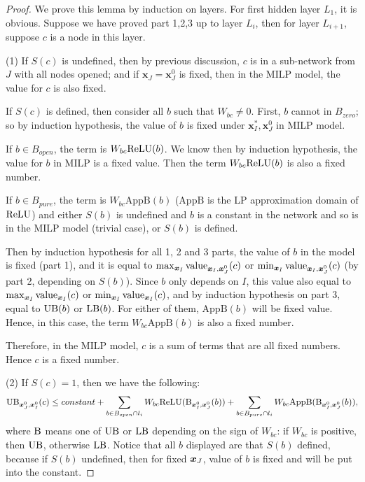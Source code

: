 			\begin{proof}
				We prove this lemma by induction on layers. For first hidden layer $L_1$, it is obvious. Suppose we have proved part 1,2,3 up to layer $L_i$, then for layer $L_{i+1}$, suppose $c$ is a node in this layer. 
				
				(1)	If $S(c)$ is undefined, then by previous discussion, $c$ is in a sub-network from $J$ with all nodes opened; and if $\boldsymbol{x}_J=\boldsymbol{x}_J^0$ is fixed, then in the MILP model, the value for $c$ is also fixed. 
				
				If $S(c)$ is defined, then consider all $b$ such that $W_{bc}\neq 0$. First, $b$ cannot in $B_{zero}$; so by induction hypothesis, the value of $b$ is fixed under $\boldsymbol{x}^*_I,\boldsymbol{x}^0_J$ in MILP model. 
				
				
				
				If $b\in B_{open}$, the term is $W_{bc}\mathrm{ReLU}(b)$. We know then by induction hypothesis, the value for $b$ in MILP is a fixed value. Then the term $W_{bc}\mathrm{ReLU}(b)$ is also a fixed number.  
				
				If $b\in B_{pure}$, the term is $W_{bc}\mathrm{AppB}(b)$ ($\mathrm{AppB}$ is the LP approximation domain of $\mathrm{ReLU}$) and either $S(b)$ is undefined and $b$ is a constant in the network and so is in the MILP model (trivial case), or $S(b)$ is defined. 
				
				Then by induction hypothesis for all 1, 2 and 3 parts,  the value of $b$ in the model is fixed (part 1), and it is equal to $\max_{\boldsymbol{x}_I} {\textrm{value}}_{\boldsymbol{x}_I,\boldsymbol{x}^0_J}(c)$ or $\min_{\boldsymbol{x}_I} {\textrm{value}}_{\boldsymbol{x}_I,\boldsymbol{x}^0_J}(c)$ (by part 2, depending on $S(b)$). Since $b$ only depends on $I$, this value also equal to $\max_{\boldsymbol{x}_I} {\textrm{value}}_{\boldsymbol{x}_I}(c)$ or $\min_{\boldsymbol{x}_I} {\textrm{value}}_{\boldsymbol{x}_I}(c)$, and by induction hypothesis on part 3, equal to $\mathrm{UB}(b)$ or $\mathrm{LB}(b)$. For either of them, $\mathrm{AppB}(b)$ will be fixed value. Hence, in this case, the term $W_{bc}\mathrm{AppB}(b)$ is also a fixed number.
				
				Therefore, in the MILP model, $c$ is a sum of terms that are all fixed numbers. Hence $c$ is a fixed number.
				
				(2) If $S(c)=1$, then we have the following:	\begin{align*}
					\mathrm{UB}_{\boldsymbol{x}^0_J,\boldsymbol{x}^0_I}(c) \leq constant + \sum_{b\in B_{open}\cap l_i} W_{bc}\mathrm{ReLU}(\mathrm{B}_{\boldsymbol{x}^0_I,\boldsymbol{x}^0_J}(b)) + \sum_{b\in B_{pure}\cap l_{i}} W_{bc} \mathrm{AppB}(\mathrm{B}_{\boldsymbol{x}^0_I,\boldsymbol{x}^0_J}(b)),
				\end{align*}where $\mathrm{B}$ means one of $\mathrm{UB}$ or $\mathrm{LB}$ depending on the sign of $W_{bc}$: if $W_{bc}$ is positive, then $\mathrm{UB}$, otherwise $\mathrm{LB}$. Notice that all $b$ displayed are that $S(b)$ defined, because if $S(b)$ undefined, then for fixed $\boldsymbol{x}_J$, value of $b$ is fixed and will be put into the constant.
				

\end{proof}
